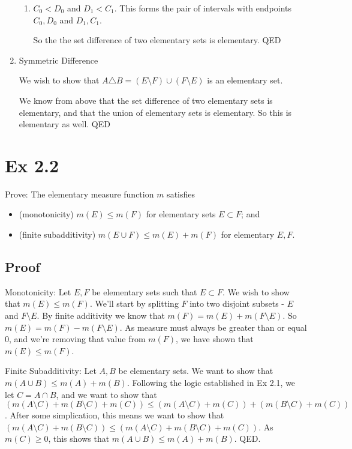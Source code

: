 \documentclass{article}
\begin{document}
\begin{enumerate}
\begin{enumerate}
\item $C_0 < D_0$ and $D_1 < C_1$. This forms the pair of intervals with endpoints $C_0, D_0$ and $D_1, C_1$.

So the the set difference of two elementary sets is elementary. QED
\end{enumerate}

\item Symmetric Difference

We wish to show that $A \triangle B = (E \setminus F) \cup (F \setminus E)$ is an elementary set. 

We know from above that the set difference of two elementary sets is elementary, and that the union of elementary sets is elementary. So this is elementary as well. QED

\end{enumerate}

 \section{Ex 2.2}
Prove: The elementary measure function $m$ satisfies
  \begin{itemize}
  \item (monotonicity) $m(E)\leq m(F)$ for elementary sets $E\subset F$; and
  \item (finite subadditivity) $m(E\cup F)\leq m(E)+m(F)$ for elementary $E,F$.
\end{itemize}

\subsection{Proof}

Monotonicity: Let $E, F$ be elementary sets such that $E \subset F$. We wish to show that $m(E) \leq m(F)$. We'll start by splitting $F$ into two disjoint subsets - $E$ and $F \setminus E$. By finite additivity we know that $m(F) = m(E) + m(F \setminus E)$. So $m(E) = m(F) - m(F \setminus E)$. As measure must always be greater than or equal 0, and we're removing that value from $m(F)$, we have shown that $m(E) \leq m(F)$. 


Finite Subadditivity: Let $A, B$ be elementary sets. We want to show that $m(A\cup B)\leq m(A)+m(B)$. Following the logic established in Ex 2.1, we let $C = A \cap B$, and we want to show that $(m(A \setminus C) + m(B \setminus C) + m(C)) \leq (m(A \setminus C) + m(C)) + (m(B \setminus C) + m(C))$. After some simplication, this means we want to show that $(m(A \setminus C) + m(B \setminus C)) \leq (m(A \setminus C) + m(B \setminus C) + m(C))$. As $m(C) \geq 0$, this shows that $m(A\cup B)\leq m(A)+m(B)$. QED. 
\end{document}
